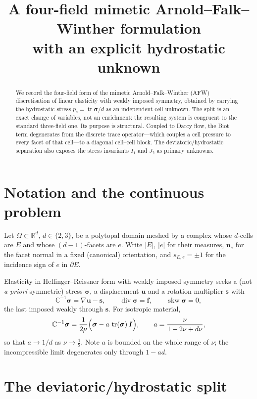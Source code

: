 \documentclass[11pt,a4paper]{article}
\title{A four-field mimetic Arnold--Falk--Winther formulation\\
       with an explicit hydrostatic unknown}
\author{}
\date{}
\newcommand{\tr}{\operatorname{tr}}
\newcommand{\skw}{\operatorname{skw}}
\newcommand{\dv}{\operatorname{div}}
\newcommand{\bsig}{\boldsymbol{\sigma}}
\newcommand{\bu}{\boldsymbol{u}}
\newcommand{\bn}{\boldsymbol{n}}
\newcommand{\bI}{\boldsymbol{I}}
\newcommand{\bC}{\mathbb{C}}
\newcommand{\Real}{\mathbb{R}}
\theoremstyle{plain}
\theoremstyle{remark}
\begin{document}
\maketitle

\begin{abstract}
We record the four-field form of the mimetic Arnold--Falk--Winther (AFW)
discretisation of linear elasticity with weakly imposed symmetry, obtained by
carrying the hydrostatic stress $p_s = \tr\bsig/d$ as an independent cell
unknown. The split is an exact change of variables, not an enrichment: the
resulting system is congruent to the standard three-field one. Its purpose is
structural. Coupled to Darcy flow, the Biot term degenerates from the discrete
trace operator---which couples a cell pressure to every facet of that
cell---to a diagonal cell--cell block. The deviatoric/hydrostatic separation
also exposes the stress invariants $I_1$ and $J_2$ as primary unknowns.
\end{abstract}

\section{Notation and the continuous problem}

Let $\Omega\subset\Real^d$, $d\in\{2,3\}$, be a polytopal domain meshed by a
complex whose $d$-cells are $E$ and whose $(d-1)$-facets are $e$. Write
$|E|$, $|e|$ for their measures, $\bn_e$ for the facet normal in a fixed
(canonical) orientation, and $s_{E,e}=\pm1$ for the incidence sign of $e$ in
$\partial E$.

Elasticity in Hellinger--Reissner form with weakly imposed symmetry seeks a
(not \emph{a priori} symmetric) stress $\bsig$, a displacement $\bu$ and a
rotation multiplier $\boldsymbol{s}$ with
\begin{equation}
  \bC^{-1}\bsig = \nabla\bu - \boldsymbol{s},\qquad
  \dv\bsig = \boldsymbol{f},\qquad
  \skw\bsig = 0 ,
  \label{eq:hr}
\end{equation}
the last imposed weakly through $\boldsymbol{s}$. For isotropic material,
\begin{equation}
  \bC^{-1}\bsig = \frac{1}{2\mu}\Bigl(\bsig - a\,\tr(\bsig)\,\bI\Bigr),
  \qquad
  a = \frac{\nu}{1-2\nu+d\nu},
  \label{eq:compliance}
\end{equation}
so that $a\to 1/d$ as $\nu\to\tfrac12$. Note $a$ is bounded on the whole range
of $\nu$; the incompressible limit degenerates only through $1-ad$.

\section{The deviatoric/hydrostatic split}
\end{document}
